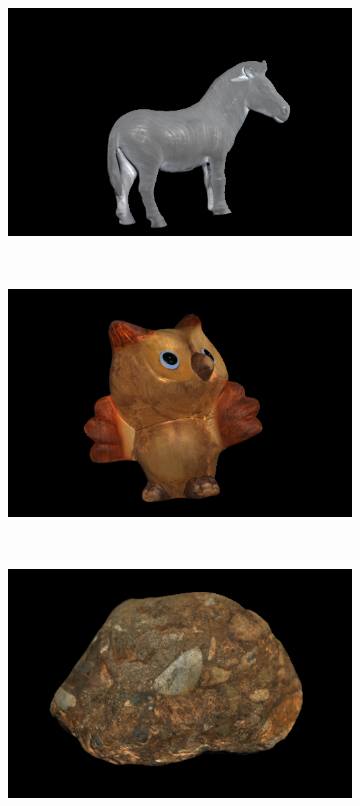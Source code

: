 \documentclass{paper}
\begin{document}
\begin{figure}[h!]
\begin{subfigure}{0.3\textwidth}
        \end{subfigure}
        \begin{subfigure}{0.3\textwidth}
                \includegraphics[width=\textwidth]{report_fig/horse_ca}
        \end{subfigure}
        ~ 
        \begin{subfigure}{0.3\textwidth}
                \includegraphics[width=\textwidth]{report_fig/owl_ca}
        \end{subfigure}
        ~ 
        \begin{subfigure}{0.3\textwidth}
                \includegraphics[width=\textwidth]{report_fig/rock_ca}

\end{subfigure}
\end{figure}
\end{document}
